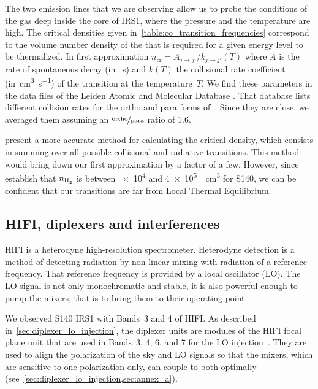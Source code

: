 The two emission lines that we are observing allow us to probe the conditions of the gas deep inside the core of IRS1, where the pressure and the temperature are high.
The critical densities given in~\cref{table:co_transition_frequencies} correspond to the volume number density of the  that is required for a given energy level to be thermalized.
In first approximation
$n_\text{cr} = A_{j\!\rightarrow\!j'} / k_{j\!\rightarrow\!j'}(T)$
where $A$ is the rate of spontaneous decay (in \si{\per\second})
and $k(T)$ the collisional rate coefficient (in~\si{\centi\meter\cubed\per\second})
of the  transition at the temperature~$T$.
We find these parameters in the data files of the Leiden Atomic and Molecular Database \parencite{schoier2004leidenmoldb}.
That database lists different collision rates for the ortho and para forms of~.
Since they are close, we averaged them assuming an $\nicefrac{\text{ortho}}{\text{para}}$ ratio of \num{1.6}.

\Textcite{yang2010} present a more accurate method for calculating the critical density,
which consists in summing over all possible collisional and radiative transitions.
This method would bring down our first approximation by a factor of a few.
However, since \textcite{poelman2006line} establish that $n_\text{\ce{H2}}$ is between \num{e4} and \SI{4e5}{\per\centi\meter\cubed} for S140,
we can be confident that our transitions are far from Local Thermal Equilibrium.



\subsection{HIFI, diplexers and interferences}
\label{sec:hifi_diplexers_interferences}

HIFI is a heterodyne high-resolution spectrometer.
Heterodyne detection is a method of detecting radiation by non-linear mixing with radiation of a reference frequency.
That reference frequency is provided by a local oscillator (LO).
The LO signal is not only monochromatic and stable, it is also powerful enough to pump the mixers, that is to bring them to their operating point.

We observed S140 IRS1 with Bands~3 and 4 of HIFI.
As described in~\vref{sec:diplexer_lo_injection},
the diplexer units are modules of the HIFI focal plane unit that are used in Bands~3, 4, 6, and 7 for the LO injection~\parencite{jackson2002hifi}.
They are used to align the polarization of the sky and LO signals so that the mixers, which are sensitive to one polarization only, can couple to both optimally
(see~\cref{sec:diplexer_lo_injection,sec:annex_a}).

